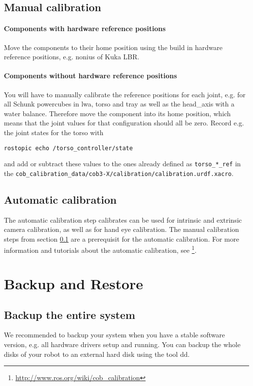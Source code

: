 \subsection{Manual calibration}\label{sec:manual_calibration}

\paragraph{Components with hardware reference positions}
Move the components to their home position using the build in hardware reference positions, e.g. nonius of Kuka LBR.

\paragraph{Components without hardware reference positions}
You will have to manually calibrate the reference positions for each joint, e.g. for all Schunk powercubes in lwa, torso and tray as well as the head\_axis with a water balance. Therefore move the component into its home position, which means that the joint values for that configuration should all be zero. Record e.g. the joint states for the torso with
\begin{lstlisting}
rostopic echo /torso_controller/state
\end{lstlisting}
and add or subtract these values to the ones already defined as \texttt{torso\_*\_ref} in the \texttt{cob\_calibration\_data/cob3-X/calibration/calibration.urdf.xacro}.

\subsection{Automatic calibration}
The automatic calibration step calibrates can be used for intrinsic and extrinsic camera calibration, as well as for hand eye calibration. The manual calibration steps from section \ref{sec:manual_calibration} are a prerequisit for the automatic calibration. For more information and tutorials about the automatic calibration, see \footnote{\url{http://www.ros.org/wiki/cob_calibration}}.

\section{Backup and Restore} 
\subsection{Backup the entire system}  
We recommended to backup your system when you have a stable software version, e.g. all hardware drivers setup and running. You can backup the whole disks of your robot to an external hard disk using the tool dd.

